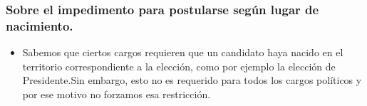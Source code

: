 \subsubsection{Sobre el impedimento para postularse según lugar de nacimiento.}

\begin{itemize}
\item{Sabemos que ciertos cargos requieren que un candidato haya nacido en el territorio correspondiente a la elección, como por ejemplo la elección de Presidente.Sin embargo, esto no es requerido para todos los cargos políticos y por ese motivo no forzamos esa restricción.}
\end{itemize}
